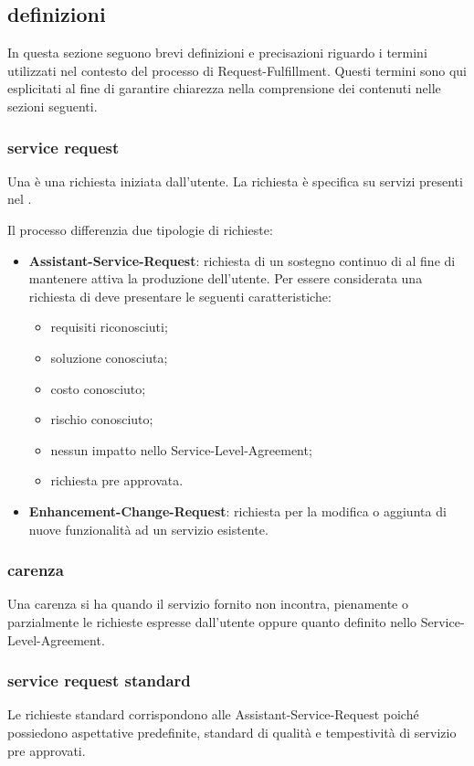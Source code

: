 \subsection[Definizioni]{definizioni}
\label{rf-introduction-definitions}
In questa sezione seguono brevi definizioni e precisazioni riguardo i termini utilizzati nel contesto del processo di \ac{Request-Fulfillment}. Questi termini sono qui esplicitati al fine di garantire chiarezza nella comprensione dei contenuti nelle sezioni seguenti.

\subsubsection{service request}
Una  è una richiesta iniziata dall'utente. La richiesta è specifica su servizi presenti nel .

Il processo differenzia due tipologie di richieste:

\begin{itemize}
\item{\textbf{\ac{Assistant-Service-Request}}: richiesta di un sostegno continuo di  al fine di mantenere attiva la produzione dell'utente. Per essere considerata una richiesta di  deve presentare le seguenti caratteristiche:}
\begin{itemize}
\item{requisiti riconosciuti;}
\item{soluzione conosciuta;}
\item{costo conosciuto;}
\item{rischio conosciuto;}
\item{nessun impatto nello \ac{Service-Level-Agreement};}
\item{richiesta pre approvata.}
\end{itemize}
\item{\textbf{\ac{Enhancement-Change-Request}}: richiesta per la modifica o aggiunta di nuove funzionalità ad un servizio esistente.}
\end{itemize}

\subsubsection{carenza}
Una carenza si ha quando il servizio fornito non incontra, pienamente o parzialmente le richieste espresse dall'utente oppure quanto definito nello \ac{Service-Level-Agreement}.

\subsubsection{service request standard}
Le richieste standard corrispondono alle \ac{Assistant-Service-Request} poiché possiedono aspettative predefinite, standard di qualità e tempestività di servizio pre approvati.


